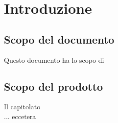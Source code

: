 \section{Introduzione}
\subsection{Scopo del documento}
Questo documento ha lo scopo di

\subsection{Scopo del prodotto}
Il capitolato \\
... eccetera
	